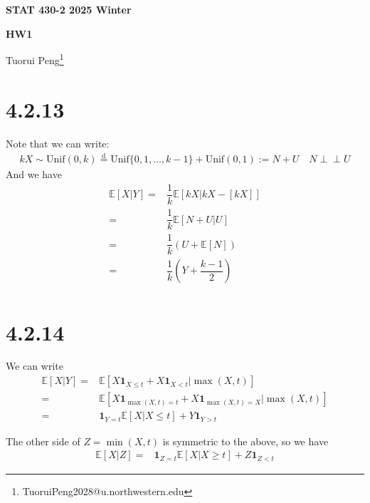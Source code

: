 \documentclass[11pt,a4paper]{ctexart}
\numberwithin{equation}{section}%
\begin{document}
\begin{center}\thispagestyle{plain}

{\LARGE\textbf{STAT 430-2 2025 Winter}}

{\Large\textbf{HW1}}

Tuorui Peng\footnote{TuoruiPeng2028@u.northwestern.edu}
\end{center}

\thispagestyle{myheadings}
\pagestyle{myheadings}



\section{4.2.13}

Note that we can write:
\begin{align*}
    kX\sim \mathrm{ Unif }(0,k) \mathop{ = }\limits^{\mathrm{ d } } \mathrm{ Unif }\{0,1,\ldots, k-1\} +  \mathrm{ Unif }(0,1) := N + U\quad N\perp \!\!\!\perp U
\end{align*}
And we have
\begin{align*}
    \mathbb{E}\left[ X|Y \right] =& \dfrac{ 1 }{ k }\mathbb{E}\left[ kX| kX-[kX] \right]\\
    =& \dfrac{ 1 }{ k }\mathbb{E}\left[ N+U | U \right]\\
    =& \dfrac{ 1 }{ k }(U + \mathbb{E}\left[ N \right] )\\
    =& \dfrac{ 1 }{ k }( Y + \dfrac{ k-1 }{ 2 })\\
\end{align*}


\section{4.2.14}
We can write
\begin{align*}
    \mathbb{E}\left[ X|Y \right] =& \mathbb{E}\left[ X\mathbf{1}_{X\leq t} + X\mathbf{1}_{X<t} | \max (X,t) \right]\\
    =& \mathbb{E}\left[ X\mathbf{1}_{\max (X,t) = t} + X\mathbf{1}_{\max (X,t) = X} | \max (X,t) \right]\\
    =& \mathbf{1}_{Y = t}\mathbb{E}\left[ X|X\leq t \right] + Y\mathbf{1}_{Y > t}
\end{align*}

The other side of $ Z=\min (X,t) $ is symmetric to the above, so we have
\begin{align*}
    \mathbb{E}\left[ X|Z \right] =& \mathbf{1}_{Z = t}\mathbb{E}\left[ X|X\geq t \right] + Z\mathbf{1}_{Z < t} 
\end{align*}
\end{document}
